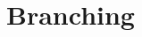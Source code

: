 \documentclass[]{article}
\title{}
\author{}
\begin{document}
\maketitle




\section{Branching}
\end{document}
